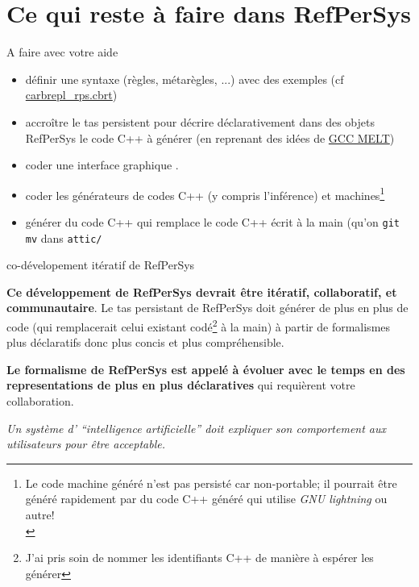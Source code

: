 \documentclass[final,a4,xcolor={svgnames,dvipsnames}]{beamer}
\begin{document}
 \section{Ce qui reste à faire dans RefPerSys}
 \label{sec:refpersys-a-faire}
 \begin{frame}{A faire avec votre aide}
   \begin{itemize}
   \item définir une syntaxe (règles, métarègles, ...) avec des exemples (cf \href{https://github.com/RefPerSys/RefPerSys/blob/master/carbrepl_rps.cbrt}{carbrepl\_rps.cbrt})
   \item accroître le tas persistent pour décrire déclarativement dans
     des objets RefPerSys le code C++ à générer (en reprenant des idées de \href{https://arxiv.org/abs/1109.0779}{GCC MELT})
     \item coder une interface graphique {}.
   \item coder les générateurs de codes C++ (y compris l'inférence) et machines\footnote{Le
   code machine généré n'est pas persisté car non-portable; il
   pourrait être généré rapidement par du code C++ généré qui utilise \textit{GNU lightning} ou autre!\medskip\\}
     \item générer du code C++ qui remplace le code C++ écrit à la
       main (qu'on \texttt{git mv} dans \texttt{attic/}
   \end{itemize}

 \end{frame}

 \begin{frame}{co-dévelopement itératif de RefPerSys}
   
   \textbf{Ce développement de RefPerSys devrait être itératif,
     collaboratif, et communautaire}. Le tas persistant de RefPerSys
   doit générer de plus en plus de code (qui remplacerait celui
   existant codé\footnote{J'ai pris soin de nommer les identifiants
   C++ de manière à espérer les générer} à la main) à partir de
   formalismes plus déclaratifs donc plus concis et plus
   compréhensible.

   \bigskip
   
   \textbf{Le formalisme de RefPerSys est appelé à évoluer avec le
     temps en des representations de plus en plus déclaratives} qui
   requièrent votre collaboration.

   \bigskip
   
   \textit{Un système d' ``intelligence artificielle'' doit expliquer
     son comportement aux utilisateurs pour être acceptable.}
 \end{frame}
\end{document}
